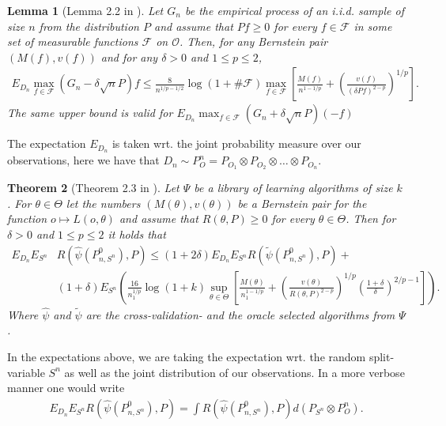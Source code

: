 \documentclass[11pt, a4paper]{article}
\newtheorem{theorem}{Theorem}
\newtheorem{lemma}[theorem]{Lemma}
\theoremstyle{definition}
\theoremstyle{remark}
\newcommand{\ml}{k}
\newcommand{\btheta}{\theta}
\newcommand{\la}{\psi}
\newcommand{\Sn}{S^n}
\newcommand{\lib}{\Psi}
\begin{document}
\begin{lemma}[Lemma 2.2 in \parencite{vaart06}] \label{finitesamplebound}
    Let $G_{n}$ be the empirical process of an i.i.d. sample of size $n$ from the distribution $P$ and assume that $P f \geq 0$ for every $f \in \mathcal{F}$ in some set of measurable functions $ \mathcal{F} $ on $ \mathcal{O} $. Then, for any Bernstein pair $(M(f), v(f))$ and for any $\delta>0$ and $1 \leq p \leq 2$,
    \begin{align*}
        E_{D_n} \max_{f \in \mathcal{F}}(G_n-\delta \sqrt{n} P) f \leq \frac{8}{n^{1 / p-1 / 2}} \log (1+\# \mathcal{F}) \max _{f \in \mathcal{F}}\left[\frac{M(f)}{n^{1-1 / p}}+\left(\frac{v(f)}{(\delta P f)^{2-p}}\right)^{1 / p}\right].
    \end{align*}
    The same upper bound is valid for $ E_{D_n} \max_{f \in \mathcal{F}}(G_n+\delta \sqrt{n} P)(-f) $  
\end{lemma}
The expectation $ E_{D_n} $ is taken wrt. the joint probability measure over our observations, here we have that $ D_n \sim P_{O}^{n} = P_{O_1} \otimes P_{O_2} \otimes \dots \otimes P_{O_n} $. 

\begin{theorem}[Theorem 2.3 in \parencite{vaart06}] \label{finitesample}
   Let $ \lib $ be a library of learning algorithms of size $ \ml $. For $ \btheta \in \Theta $ let the numbers $ (M(\btheta) , v(\btheta)) $ be a Bernstein pair for the function $ o \mapsto L(o, \btheta) $ and assume that $ R(\btheta, P) \geq 0 $ for every $ \btheta \in \Theta $. Then for $ \delta > 0 $ and $ 1 \leq p \leq 2 $ it holds that 
   \begin{align*}
       E_{D_n} E_{\Sn} &R(\hat{\la}(P_{n, \Sn}^{0}), P) \leq(1 + 2 \delta) E_{D_n} E_{\Sn} R( \tilde{\la}(P_{n,\Sn}^{0}), P) +\\
                       &(1 + \delta) E_{\Sn} \left(  \frac{16}{n_1^{1/p}} \log (1 +k) \sup_{\btheta \in \Theta} \left[ \frac{M(\btheta)}{n_1^{1-1/p}} +  \left( \frac{v(\btheta)}{R(\btheta, P)^{2-p}} \right)^{1/p} \left( \frac{1 + \delta}{\delta} \right)^{2/p-1} \right]\right).
   \end{align*}
   Where $ \hat{\la} $ and $ \tilde{\la} $ are the cross-validation- and the oracle selected algorithms from $ \lib $. 
\end{theorem}
In the expectations above, we are taking the expectation wrt. the random split-variable $ \Sn $ as well as the joint distribution of our observations. In a more verbose manner one would write 
\begin{align*}
    E_{D_n} E_{\Sn}  R(\hat{\la}(P_{n, \Sn}^{0}), P) = \int R(\hat{\la}(P_{n, \Sn}^{0}), P) d (P_{\Sn} \otimes  P^{n}_O ).
\end{align*}
\end{document}
